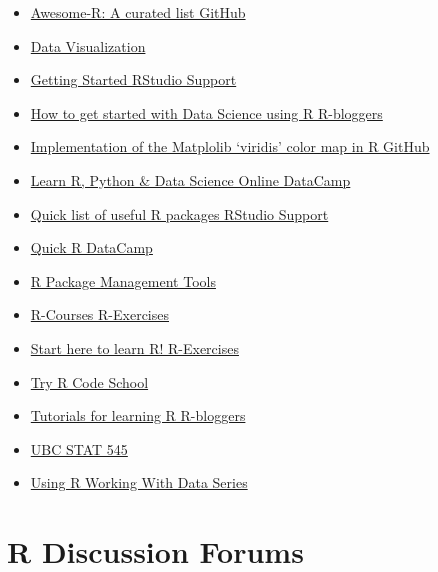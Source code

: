 \documentclass[]{book}
\providecommand{\tightlist}{%
  \setlength{\itemsep}{0pt}\setlength{\parskip}{0pt}}
\theoremstyle{definition}
\theoremstyle{definition}
\theoremstyle{definition}
\theoremstyle{remark}
\begin{document}
\begin{itemize}
\tightlist
\item
  \href{https://github.com/qinwf/awesome-R}{Awesome-R: A curated list
  \textbar{} GitHub}
\item
  \href{http://socviz.co/index.html}{Data Visualization}
\item
  \href{https://support.rstudio.com/hc/en-us/sections/200271437-Getting-Started}{Getting
  Started \textbar{} RStudio Support}
\item
  \href{https://www.r-bloggers.com/how-to-get-started-with-data-science-using-r/}{How
  to get started with Data Science using R \textbar{} R-bloggers}
\item
  \href{https://github.com/sjmgarnier/viridis}{Implementation of the
  Matplolib `viridis' color map in R \textbar{} GitHub}
\item
  \href{https://www.datacamp.com/}{Learn R, Python \& Data Science
  Online \textbar{} DataCamp}
\item
  \href{https://support.rstudio.com/hc/en-us/articles/201057987-Quick-list-of-useful-R-packages}{Quick
  list of useful R packages \textbar{} RStudio Support}
\item
  \href{https://www.statmethods.net/r-tutorial/index.html}{Quick R
  \textbar{} DataCamp}
\item
  \href{https://stat.ethz.ch/R-manual/R-devel/library/utils/html/packageStatus.html}{R
  Package Management Tools}
\item
  \href{https://www.r-exercises.com/r-courses/}{R-Courses \textbar{}
  R-Exercises}
\item
  \href{https://www.r-exercises.com/start-here-to-learn-r/}{Start here
  to learn R! \textbar{} R-Exercises}
\item
  \href{http://tryr.codeschool.com/}{Try R \textbar{} Code School}
\item
  \href{https://www.r-bloggers.com/how-to-learn-r-2/}{Tutorials for
  learning R \textbar{} R-bloggers}
\item
  \href{http://stat545.com/index.html}{UBC STAT 545}
\item
  \href{http://mazamascience.com/WorkingWithData/?series=using-r}{Using
  R \textbar{} Working With Data Series}
\end{itemize}

\hypertarget{r-discussion-forums}{%
\section{R Discussion Forums}\label{r-discussion-forums}}
\end{document}

